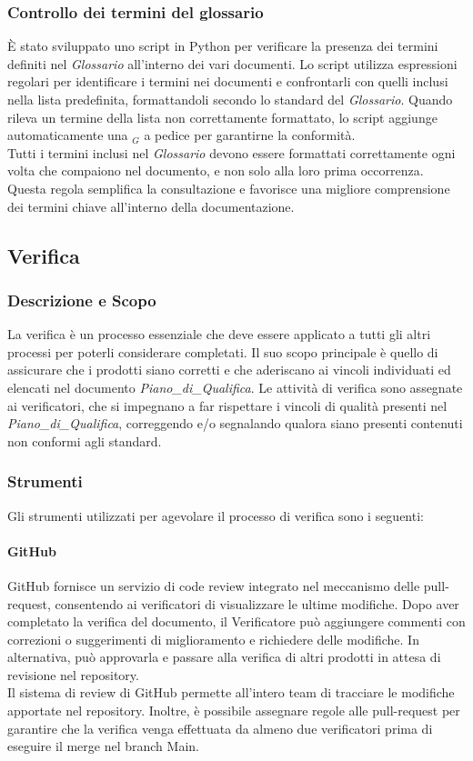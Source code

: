 \documentclass[10pt]{article}
\begin{document}
\begin{justify}
    \subsubsection{Controllo dei termini del glossario}
    È stato sviluppato uno script in Python per verificare la presenza dei termini definiti nel \textit{Glossario} all'interno dei vari documenti. Lo script utilizza espressioni regolari per identificare i termini nei documenti e confrontarli con quelli inclusi nella lista predefinita, formattandoli secondo lo standard del \textit{Glossario}. Quando rileva un termine della lista non correttamente formattato, lo script aggiunge automaticamente una $_G$ a pedice per garantirne la conformità.\\
    Tutti i termini inclusi nel \textit{Glossario} devono essere formattati correttamente ogni volta che compaiono nel documento, e non solo alla loro prima occorrenza. Questa regola semplifica la consultazione e favorisce una migliore comprensione dei termini chiave all'interno della documentazione.

    \subsection{Verifica}
    \label{verifica}
    \subsubsection{Descrizione e Scopo} 
    La verifica è un processo essenziale che deve essere applicato a tutti gli altri processi per poterli considerare completati. Il suo scopo principale è quello di assicurare che i prodotti siano corretti e che aderiscano ai vincoli individuati ed elencati nel documento \textit{Piano\_di\_Qualifica}. Le attività di verifica sono assegnate ai verificatori, che si impegnano a far rispettare i vincoli di qualità presenti nel \textit{Piano\_di\_Qualifica}, correggendo e/o segnalando qualora siano presenti contenuti non conformi agli standard.
    \subsubsection{Strumenti}
    Gli strumenti utilizzati per agevolare il processo di verifica sono i seguenti:
    \paragraph{GitHub}
    GitHub fornisce un servizio di code review integrato nel meccanismo delle pull-request, consentendo ai verificatori di visualizzare le ultime modifiche. Dopo aver completato la verifica del documento, il Verificatore può aggiungere commenti con correzioni o suggerimenti di miglioramento e richiedere delle modifiche. In alternativa, può approvarla e passare alla verifica di altri prodotti in attesa di revisione nel repository.\\
    Il sistema di review di GitHub permette all'intero team di tracciare le modifiche apportate nel repository. Inoltre, è possibile assegnare regole alle pull-request per garantire che la verifica venga effettuata da almeno due verificatori prima di eseguire il merge nel branch Main.


\end{justify}
\end{document}
